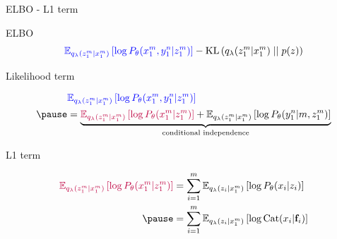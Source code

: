 \begin{frame}{ELBO - L1 term}

ELBO
\begin{equation*}
\begin{aligned}
\textcolor{blue}{\mathbb E_{q_\lambda(z_1^m|x_1^m)}\left[ \log P_\theta(x_1^m, y_1^n|z_1^m)\right]} - \operatorname{KL}\left(q_\lambda(z_1^m|x_1^m)\mid\mid p(z)\right) 
\end{aligned}
\end{equation*}

\pause

Likelihood term
\begin{small}
\begin{equation*}
\begin{aligned}
&\textcolor{blue}{\mathbb E_{q_\lambda(z_1^m|x_1^m)}\left[ \log P_\theta(x_1^m, y_1^n|z_1^m)\right]} \\ \pause
&= \underbrace{\textcolor{purple}{\mathbb E_{q_\lambda(z_1^m|x_1^m)}\left[ \log P_\theta(x_1^m|z_1^m)\right]} + \mathbb E_{q_\lambda(z_1^m|x_1^m)}\left[ \log P_\theta(y_1^n|m, z_1^m)\right]}_{\text{conditional independence}}
\end{aligned}
\end{equation*}
\end{small}

\pause
L1 term
\begin{small}
\begin{equation*}
\begin{aligned}
\textcolor{purple}{\mathbb E_{q_\lambda(z_1^m|x_1^m)}\left[ \log P_\theta(x_1^m|z_1^m)\right]} 
&= \sum_{i=1}^m \mathbb E_{q_\lambda(z_i|x_1^m)}\left[ \log P_\theta(x_i|z_i)\right] \\ \pause
&= \sum_{i=1}^m \mathbb E_{q_\lambda(z_i|x_1^m)} \left[ \log \Cat(x_i|\mathbf f_i)\right] 
\end{aligned}
\end{equation*}
\end{small}


\end{frame}



